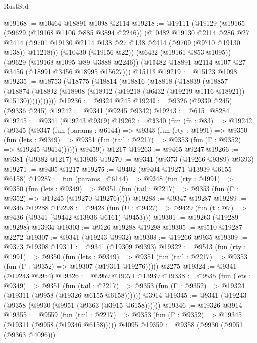 \begin{lexlean}{RustStd}
\begin{coremodule}
@19168 := @10464 @18891 @1098 @2114
@19218 := @19111
    (@19129
      (@19165
        (@9629 (@19168 @1106 @885 @3894 @2246))
        (@10482
          @19130
          @2114
          @286
          @27
          @2414
          (@9701 @19130 @2114 @138 @27 @138 @2414 (@9709 (@9710 @19130 @138)) @11218)))
      (@10430 (@19156 @22))
      (@6432 (@19161 @853 @1095))
      (@9629 (@19168 @1095 @89 @3888 @2246))
      (@10482 @18891 @2114 @107 @27 @3456 (@18991 @3456 @18995 @15627)))
    @15118
@19219 := @15123 @1098
@19235 := @18753
    (@18775
      (@18814
        (@18816
          (@18818
            (@18839
              (@18857
                (@18874
                  (@18892 (@18908 (@18912 (@19218 (@6432 (@19219 @1116 @18921)) @15130)))))))))))
@19236 := @9324 @245
@19240 := @9326 (@9330 @245) (@9336 @245)
@19242 := @9341 (@9245 @9342)
@19243 := @6151 @8284
@19245 := @9341 (@19243 @9369)
@19262 := @9340
    (fun (fn : @83) =>
    @19242
      (@9345
        (@9347
          (fun (params : @6144) =>
          @9348
            (fun (rty : @1991) =>
            @9350
              (fun (lets : @9349) =>
              @9351 (fun (tail : @2217) => @9353 (fun (Γ : @9352) => @19245 @9414))))))
        @9459))
    @1217
@19263 := @9465 @9247
@19266 := @9381 (@9382 @1217) @13936
@19270 := @9341 (@9373 (@19266 @9389) @9393)
@19271 := @9405 @1217
@19276 := @9402 (@9404 @19271 @13939 @6155 @6158)
@19287 := fun (params : @6144) =>
  @9348
    (fun (rty : @1991) =>
    @9350
      (fun (lets : @9349) =>
      @9351 (fun (tail : @2217) => @9353 (fun (Γ : @9352) => @19245 (@19270 @19276)))))
@19288 := @9347 @19287
@19289 := @9345 @19288
@19298 := @9428
    (fun (U : @9427) => @9429 (fun (t : @7) => @9436 (@9341 (@9442 @13936 @6161) @9453)))
@19301 := @19263 (@19289 @19298) @13934
@19303 := @9326 @19288 @19298
@19305 := @9510 @19287 @2272
@19307 := @9341 (@19243 @9932)
@19308 := @19266 @9935
@19309 := @9373 @19308
@19311 := @9341 (@19309 @9393)
@19322 := @9513
    (fun (rty : @1991) =>
    @9350
      (fun (lets : @9349) =>
      @9351 (fun (tail : @2217) => @9353 (fun (Γ : @9352) => @19307 (@19311 @19276)))))
    @2275
@19324 := @9341 (@19243 @9954)
@19326 := @9959 @19271 @13939
@19338 := @9535
    (fun (lets : @9349) =>
    @9351
      (fun (tail : @2217) =>
      @9353 (fun (Γ : @9352) => @19324 (@19311 (@9958 (@19326 @6155 @6158))))))
    @3914
@19345 := @9341 (@19243 (@9358 (@9930 (@9951 (@9363 (@3915 @6158))))))
@19346 := @19326 @3914
@19355 := @9559
    (fun (tail : @2217) => @9353 (fun (Γ : @9352) => @19345 (@19311 (@9958 (@19346 @6158)))))
    @4095
@19359 := @9358 (@9930 (@9951 (@9363 @4096)))

\end{coremodule}
\end{lexlean}
